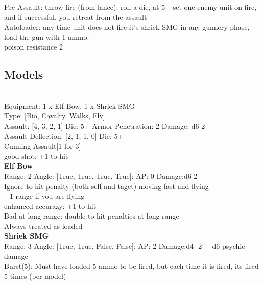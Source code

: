 Pre-Assault: throw fire (from lance): roll a die, at 5+ set one enemy unit on fire, and if successful, you retreat from the assault\\ 
Autoloader: any time unit does not fire it's shriek SMG in any gunnery phase, load the gun with 1 ammo.\\ 
poison resistance 2\\ 


\subsection{ Models }

 \\
Equipment: 1 x Elf Bow, 1 x Shriek SMG \\
Type: [Bio, Cavalry, Walks, Fly] \\

Assault: [4, 3, 2, 1] Die: 5+ Armor Penetration: 2 Damage: d6-2 \\
Assault Deflection: [2, 1, 1, 0] Die: 5+\\
\indent Cunning Assault[1 for 3]\\ 
 

good shot: +1 to hit\\ 


{\bf Elf Bow } \\



Range: 2  Angle: [True, True, True, True]: AP: 0 Damage:d6-2 \\
Ignore to-hit penalty (both self and taget) moving fast and flying\\ 
+1 range if you are flying\\ 
enhanced accurazy: +1 to hit\\ 
Bad at long range: double to-hit penalties at long range\\ 
Always treated as loaded\\ 




{\bf Shriek SMG } \\



Range: 3  Angle: [True, True, False, False]: AP: 2 Damage:d4 -2 + d6 psychic damage \\
Burst(5): Must have loaded 5 ammo to be fired, but each time it is fired, its fired 5 times (per model)\\ 





